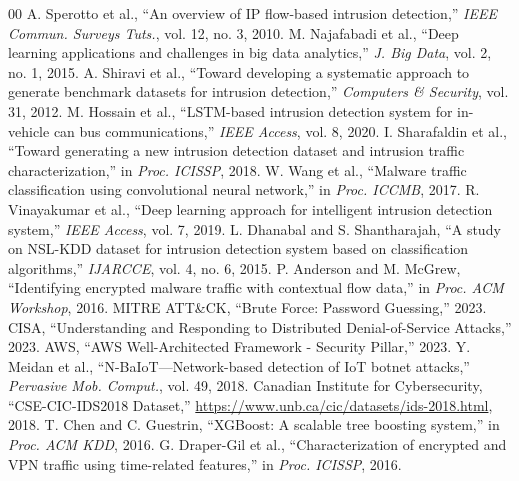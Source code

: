 \documentclass[conference]{IEEEtran}
\begin{document}
\begin{thebibliography}{00}
 A. Sperotto et al., ``An overview of IP flow-based intrusion detection,'' \textit{IEEE Commun. Surveys Tuts.}, vol. 12, no. 3, 2010.
 M. Najafabadi et al., ``Deep learning applications and challenges in big data analytics,'' \textit{J. Big Data}, vol. 2, no. 1, 2015.
 A. Shiravi et al., ``Toward developing a systematic approach to generate benchmark datasets for intrusion detection,'' \textit{Computers \& Security}, vol. 31, 2012.
 M. Hossain et al., ``LSTM-based intrusion detection system for in-vehicle can bus communications,'' \textit{IEEE Access}, vol. 8, 2020.
 I. Sharafaldin et al., ``Toward generating a new intrusion detection dataset and intrusion traffic characterization,'' in \textit{Proc. ICISSP}, 2018.
 W. Wang et al., ``Malware traffic classification using convolutional neural network,'' in \textit{Proc. ICCMB}, 2017.
 R. Vinayakumar et al., ``Deep learning approach for intelligent intrusion detection system,'' \textit{IEEE Access}, vol. 7, 2019.
 L. Dhanabal and S. Shantharajah, ``A study on NSL-KDD dataset for intrusion detection system based on classification algorithms,'' \textit{IJARCCE}, vol. 4, no. 6, 2015.
 P. Anderson and M. McGrew, ``Identifying encrypted malware traffic with contextual flow data,'' in \textit{Proc. ACM Workshop}, 2016.
 MITRE ATT\&CK, ``Brute Force: Password Guessing,'' 2023.
 CISA, ``Understanding and Responding to Distributed Denial-of-Service Attacks,'' 2023.
 AWS, ``AWS Well-Architected Framework - Security Pillar,'' 2023.
 Y. Meidan et al., ``N-BaIoT—Network-based detection of IoT botnet attacks,'' \textit{Pervasive Mob. Comput.}, vol. 49, 2018.
 Canadian Institute for Cybersecurity, ``CSE-CIC-IDS2018 Dataset,'' \url{https://www.unb.ca/cic/datasets/ids-2018.html}, 2018.
 T. Chen and C. Guestrin, ``XGBoost: A scalable tree boosting system,'' in \textit{Proc. ACM KDD}, 2016.
 G. Draper-Gil et al., ``Characterization of encrypted and VPN traffic using time-related features,'' in \textit{Proc. ICISSP}, 2016.
\end{thebibliography}
\end{document}
